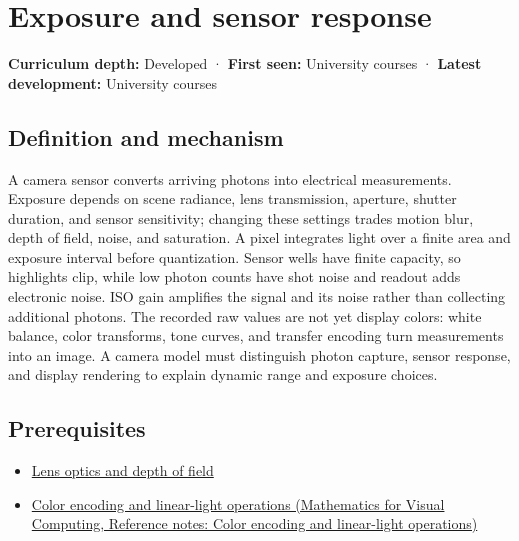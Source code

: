 \hypertarget{appendix-92d45cdf2afc}{}\label{referencestart:appendix-92d45cdf2afc}
\section{Exposure and sensor response}\label{appendix-92d45cdf2afc-exposure-and-sensor-response}

\textbf{Curriculum depth:} Developed · \textbf{First seen:} University courses · \textbf{Latest development:} University courses

\begin{allmightroledefinition}

\subsection{Definition and mechanism}\label{appendix-92d45cdf2afc-definition-and-mechanism}

A camera sensor converts arriving photons into electrical measurements. Exposure depends on scene radiance, lens transmission, aperture, shutter duration, and sensor sensitivity; changing these settings trades motion blur, depth of field, noise, and saturation. A pixel integrates light over a finite area and exposure interval before quantization. Sensor wells have finite capacity, so highlights clip, while low photon counts have shot noise and readout adds electronic noise. ISO gain amplifies the signal and its noise rather than collecting additional photons. The recorded raw values are not yet display colors: white balance, color transforms, tone curves, and transfer encoding turn measurements into an image. A camera model must distinguish photon capture, sensor response, and display rendering to explain dynamic range and exposure choices.

\end{allmightroledefinition}

\subsection{Prerequisites}\label{appendix-92d45cdf2afc-prerequisites}

\begin{itemize}
\tightlist
\item
  \hyperref[appendix-21f8456e2629]{Lens optics and depth of field}
\item
  \href{../02-Mathematics-for-Visual-Computing/main.pdf\#nameddest=appendix-a9f83ad40792}{Color encoding and linear-light operations (Mathematics for Visual Computing, Reference notes: Color encoding and linear-light operations)}
\end{itemize}

